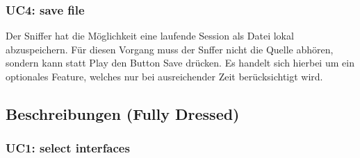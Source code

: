 \documentclass[a4,12pt]{scrartcl}
\begin{document}
\subsubsection{UC4: save file}
Der Sniffer hat die Möglichkeit eine laufende Session als Datei lokal abzuspeichern. Für diesen Vorgang muss der Snffer nicht die Quelle abhören, sondern kann statt Play den Button Save drücken. Es handelt sich hierbei um ein optionales Feature, welches nur bei ausreichender Zeit berücksichtigt wird. 
\newpage
\subsection{Beschreibungen (Fully Dressed)	}
\subsubsection{UC1: select interfaces}
\end{document}

